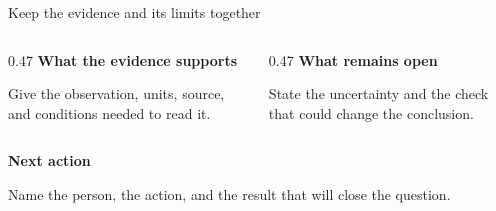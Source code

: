 \documentclass[aspectratio=169,11pt]{beamer}
\begin{document}
\begin{frame}{Keep the evidence and its limits together}
  \begin{columns}[T,onlytextwidth]
    \begin{column}{0.47\textwidth}
      \textbf{What the evidence supports}\par\medskip
      Give the observation, units, source, and conditions needed to read it.
    \end{column}
    \begin{column}{0.47\textwidth}
      \textbf{What remains open}\par\medskip
      State the uncertainty and the check that could change the conclusion.
    \end{column}
  \end{columns}
  \vspace{8mm}
  \textbf{Next action}\par\medskip
  Name the person, the action, and the result that will close the question.
\end{frame}
\end{document}
